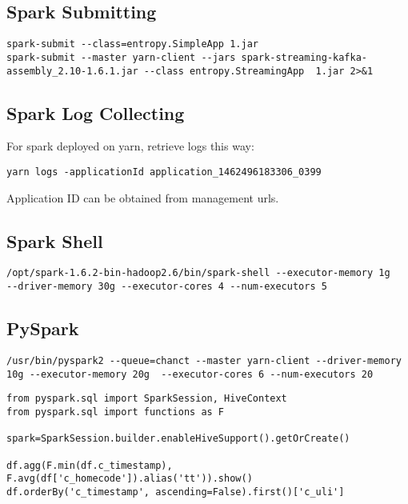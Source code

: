 \subsection{Spark Submitting}
\begin{verbatim}
spark-submit --class=entropy.SimpleApp 1.jar
spark-submit --master yarn-client --jars spark-streaming-kafka-assembly_2.10-1.6.1.jar --class entropy.StreamingApp  1.jar 2>&1
\end{verbatim}


\subsection{Spark Log Collecting}

For spark deployed on yarn, retrieve logs this way:
\begin{verbatim}
yarn logs -applicationId application_1462496183306_0399
\end{verbatim}

Application ID can be obtained from management urls.




\subsection{Spark Shell}

\begin{verbatim}
/opt/spark-1.6.2-bin-hadoop2.6/bin/spark-shell --executor-memory 1g
--driver-memory 30g --executor-cores 4 --num-executors 5 
\end{verbatim}




\subsection{PySpark}

\begin{verbatim}
/usr/bin/pyspark2 --queue=chanct --master yarn-client --driver-memory 10g --executor-memory 20g  --executor-cores 6 --num-executors 20 
\end{verbatim}



\begin{verbatim}
from pyspark.sql import SparkSession, HiveContext
from pyspark.sql import functions as F

spark=SparkSession.builder.enableHiveSupport().getOrCreate()

df.agg(F.min(df.c_timestamp), F.avg(df['c_homecode']).alias('tt')).show()
df.orderBy('c_timestamp', ascending=False).first()['c_uli']

\end{verbatim}














